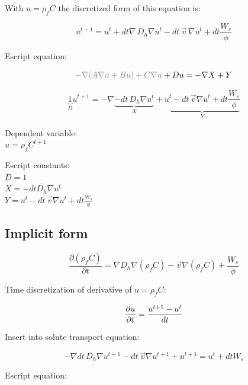 \documentclass[11pt]{article}
\begin{document}
With $ u = \rho_f C $ the discretized form of this equation is:

\begin{equation}
	u^{t+1} = u^t + dt \nabla \, D_h \nabla u^t - dt \, \vec{v} \, \nabla u^t + dt \frac{W_s}{\phi}
\end{equation}


Escript equation:

\begin{equation}
    {\color{gray} - \nabla (A \nabla u + B u ) + C \nabla u } + D u = - \nabla X  + Y
\end{equation}


\begin{equation}
	\underbrace{1}_D u^{t+1} = - \nabla \underbrace{-dt\, D_h \nabla u^t}_X + \underbrace{ u^t - dt \, \vec{v} \nabla u^t +  dt \frac{W_s}{\phi} }_Y
\end{equation}

Dependent variable: \\
$ u = \rho_f C^{t+1} $

Escript constants: \\
$ D = 1 $ \\
$ X = -dt \overline{D_h} \nabla u^t $ \\
$ Y = u^t - dt \, \vec{v} \nabla u^t +  dt \frac{W_s}{\phi} $ \\


\subsection{Implicit form}


\begin{equation}
	\frac{\partial (\rho_f C)}{\partial t} = \nabla D_h \nabla ( \rho_f C) - \vec{v} \nabla ( \rho_f C) + \frac{W_s}{\phi}	
\end{equation}

Time discretization of derivative of $u = \rho_f C$:

\begin{equation}
    { \partial u \over{\partial t} } = { u^{t+1} - u^t \over{dt} }
\end{equation}

Insert into solute transport equation:

\begin{equation}
    - \nabla dt \, \overline{D_h} \nabla u^{t+1} - dt \, \vec{v} \nabla u^{t+1} + u^{t+1}  =   u^t + dt W_s 
\end{equation}

Escript equation:
\end{document}
